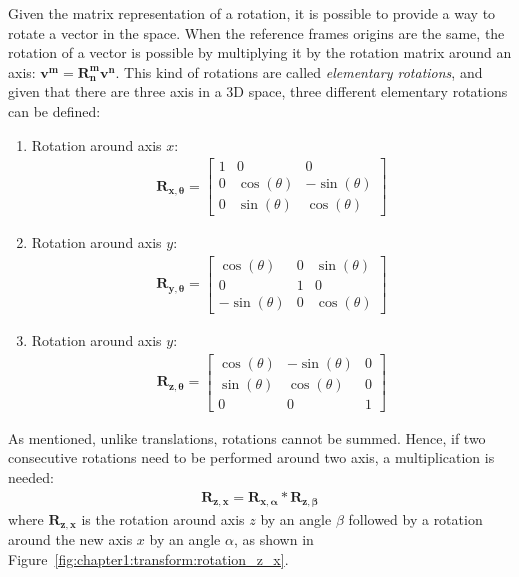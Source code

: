 Given the matrix representation of a rotation, it is possible to provide a way to rotate a vector in the space. When the reference frames origins are the same, the rotation of a vector is possible by multiplying it by the rotation matrix around an axis: $\bm{v^m} = \bm{R_n^m} \bm{v^n}$. This kind of rotations are called \emph{elementary rotations}, and given that there are three axis in a 3D space, three different elementary rotations can be defined:
\begin{enumerate}
    \item{Rotation around axis $x$: \begin{align*}
            \bm{R_{x, \theta}} = \begin{bmatrix}
                1 & 0 & 0 \\ 0 & \cos{\left(\theta\right)} & -\sin{\left(\theta\right)} \\ 0 & \sin{\left(\theta\right)} & \cos{\left(\theta\right)}
            \end{bmatrix}
    \end{align*}}
    \item{Rotation around axis $y$: \begin{align*}
        \bm{R_{y, \theta}} = \begin{bmatrix}
             \cos{\left(\theta\right)} & 0 &  \sin{\left(\theta\right)} \\ 0 & 1 & 0 \\  -\sin{\left(\theta\right)} & 0 & \cos{\left(\theta\right)}
        \end{bmatrix}
    \end{align*}}
    \item{Rotation around axis $y$: \begin{align*}
        \bm{R_{z, \theta}} = \begin{bmatrix}
            \cos{\left(\theta\right)} & -\sin{\left(\theta\right)} & 0 \\ \sin{\left(\theta\right)} & \cos{\left(\theta\right)} & 0 \\ 0 & 0 & 1
        \end{bmatrix}
    \end{align*}}
\end{enumerate}

As mentioned, unlike translations, rotations cannot be summed. Hence, if two consecutive rotations need to be performed around two axis, a multiplication is needed:
\begin{align}
    \bm{R_{z,x}} = \bm{R_{x, \alpha}} * \bm{R_{z, \beta}}
\end{align}
where $\bm{R_{z,x}}$ is the rotation around axis $z$ by an angle $\beta$ followed by a rotation around the new axis $x$ by an angle $\alpha$, as shown in Figure~\ref{fig:chapter1:transform:rotation_z_x}.

